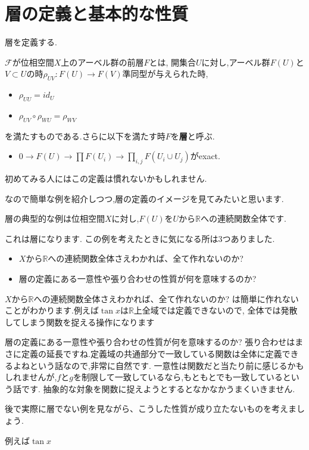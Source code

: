 \section{層の定義と基本的な性質}
層を定義する.
\begin{dfn}
$\mathcal{F}$が位相空間$X$上のアーベル群の前層$F$とは,
開集合$U$に対し,アーベル群$F(U)$と$V \subset U$の時$\rho_{UV}:F(U) \to F(V)$準同型が与えられた時,
\begin{itemize}
  \item $\rho_{UU} = id_U$
  \item $\rho_{UV} \circ \rho_{WU} = \rho_{WV}$
\end{itemize}
を満たすものである.さらに以下を満たす時$F$を\textbf{層}と呼ぶ.
\begin{itemize}
  \item $0 \to F(U) \to \prod F(U_i) \to \prod_{i,j}F(U_i \cup U_j)$がexact.
\end{itemize}
\end{dfn}

初めてみる人にはこの定義は慣れないかもしれません.

なので簡単な例を紹介しつつ,層の定義のイメージを見てみたいと思います.

層の典型的な例は位相空間$X$に対し,$F(U)$を$U$から$\mathbb{R}$への連続関数全体です.

これは層になります.
この例を考えたときに気になる所は3つありました.
\begin{itemize}
  \item $X$から$\mathbb{R}$への連続関数全体さえわかれば、全て作れないのか?
  \item 層の定義にある一意性や張り合わせの性質が何を意味するのか?
\end{itemize}

$X$から$\mathbb{R}$への連続関数全体さえわかれば、全て作れないのか?
は簡単に作れないことがわかります.例えば$\tan x$は$\mathbb{R}$上全域では定義できないので,
全体では発散してしまう関数を捉える操作になります


層の定義にある一意性や張り合わせの性質が何を意味するのか?
張り合わせはまさに定義の延長ですね.定義域の共通部分で一致している関数は全体に定義できるよねという話なので,非常に自然です.
一意性は関数だと当たり前に感じるかもしれませんが,$f$と$g$を制限して一致しているなら,もともとでも一致しているという話です.
抽象的な対象を関数に捉えようとするとなかなかうまくいきません.

後で実際に層でない例を見ながら、こうした性質が成り立たないものを考えましょう.


例えば$\tan x$

